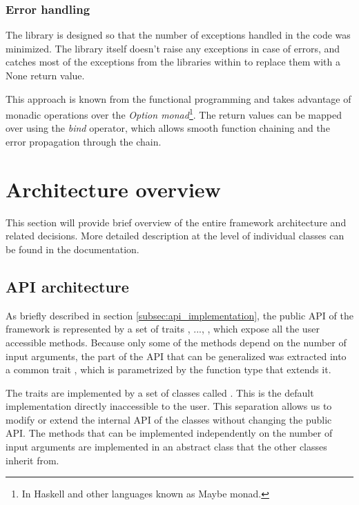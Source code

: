 \subsubsection{Error handling}

The library is designed so that the number of exceptions handled in the code was minimized. The library itself doesn't raise any exceptions in case of errors, and catches most of the exceptions from the libraries within to replace them with a None return value.

This approach is known from the functional programming and takes advantage of monadic operations over the \textit{Option monad}\footnote{In Haskell and other languages known as Maybe monad.}. The return values can be mapped over using the \textit{bind} operator, which allows smooth function chaining and the error propagation through the chain.

\section{Architecture overview}

This section will provide brief overview of the entire framework architecture and related decisions. More detailed description at the level of individual classes can be found in the documentation.

\subsection{API architecture}

As briefly described in section \ref{subsec:api_implementation}, the public API of the framework is represented by a set of traits , ..., , which expose all the user accessible methods. Because only some of the methods depend on the number of input arguments, the part of the API that can be generalized was extracted into a common trait , which is parametrized by the function type that extends it. 

The  traits are implemented by a set of classes called . This is the default implementation directly inaccessible to the user. This separation allows us to modify or extend the internal API of the  classes without changing the public API. The methods that can be implemented independently on the number of input arguments are implemented in an abstract class  that the other classes inherit from.

